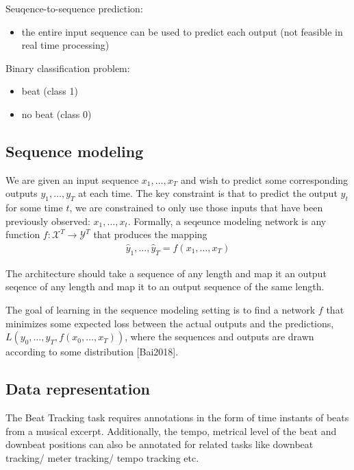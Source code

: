 \documentclass{article}
\begin{document}
Seuqence-to-sequence prediction:
\begin{itemize}
\item the entire input sequence can be used to predict each output (not feasible in real time processing)
\end{itemize}

Binary classification problem:
\begin{itemize}
\item beat (class 1)
\item no beat (class 0)
\end{itemize}


\subsection{Sequence modeling}

We are given an input sequence $x_1, \dots, x_T$ and wish to predict some corresponding outputs $y_1, \dots, y_T$ at each time. The key constraint is that to predict the output $y_t$ for some time $t$, we are constrained to only use those inputs that have been previously observed: $x_1, \dots , x_t$. Formally, a seqeunce modeling network is any function $f : \mathcal X^{T} \rightarrow \mathcal Y^{T}$ that produces the mapping
\begin{align}
\hat y_1, \dots, \hat y_T = f(x_1,\dots, x_T)
\end{align}

The architecture should take a sequence of any length and map it an output seqence of any length and map it to an output sequence of the same length.

The goal of learning in the sequence modeling setting is to find a network $f$ that minimizes some expected loss between the actual outputs and the predictions, $L(y_0,\dots,y_T, f(x_0,\dots,x_T))$, where the sequences and outputs are drawn according to some distribution [Bai2018].



\subsection{Data representation}


The Beat Tracking task requires annotations in the form of time instants of beats from a musical excerpt. Additionally, the tempo, metrical level of the beat and downbeat positions can also be annotated for related tasks like downbeat tracking/ meter tracking/ tempo tracking etc.
\end{document}

